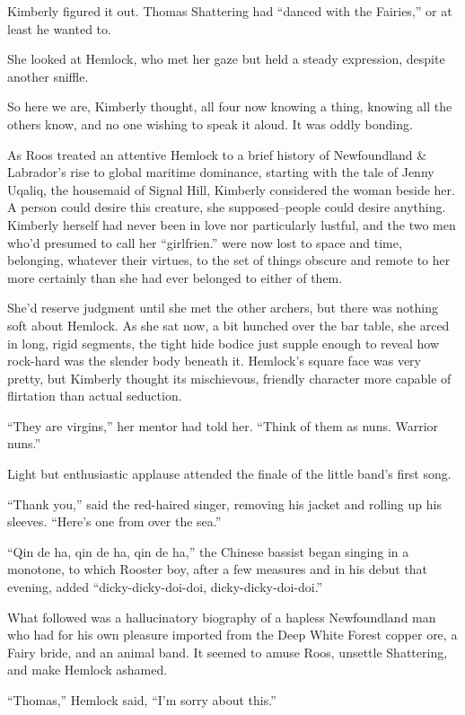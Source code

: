 \documentclass[11pt,a5paper]{article}
\begin{document}
Kimberly figured it out. Thomas Shattering had ``danced with the Fairies,'' or at least he wanted to.

She looked at Hemlock, who met her gaze but held a steady expression, despite another sniffle.

So here we are, Kimberly thought, all four now knowing a thing, knowing all the others know, and no one wishing to speak it aloud. It was oddly bonding.

As Roos treated an attentive Hemlock to a brief history of Newfoundland \& Labrador's rise to global maritime dominance, starting with the tale of Jenny Uqaliq, the housemaid of Signal Hill, Kimberly considered the woman beside her. A person could desire this creature, she supposed--people could desire anything. Kimberly herself had never been in love nor particularly lustful, and the two men who'd presumed to call her ``girlfrien.'' were now lost to space and time, belonging, whatever their virtues, to the set of things obscure and remote to her more certainly than she had ever belonged to either of them.

She'd reserve judgment until she met the other archers, but there was nothing soft about Hemlock. As she sat now, a bit hunched over the bar table, she arced in long, rigid segments, the tight hide bodice just supple enough to reveal how rock-hard was the slender body beneath it. Hemlock's square face was very pretty, but Kimberly thought its mischievous, friendly character more capable of flirtation than actual seduction.

``They are virgins,'' her mentor had told her. ``Think of them as nuns. Warrior nuns.''

Light but enthusiastic applause attended the finale of the little band's first song.

``Thank you,'' said the red-haired singer, removing his jacket and rolling up his sleeves. ``Here's one from over the sea.''

``Qin de ha, qin de ha, qin de ha,'' the Chinese bassist began singing in a monotone, to which Rooster boy, after a few measures and in his debut that evening, added ``dicky-dicky-doi-doi, dicky-dicky-doi-doi.''

What followed was a hallucinatory biography of a hapless Newfoundland man who had for his own pleasure imported from the Deep White Forest copper ore, a Fairy bride, and an animal band. It seemed to amuse Roos, unsettle Shattering, and make Hemlock ashamed.

``Thomas,'' Hemlock said, ``I'm sorry about this.''
\end{document}
